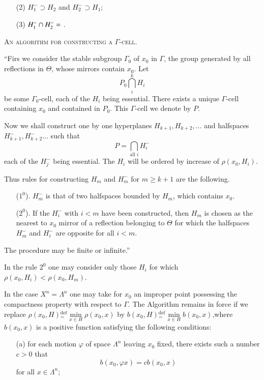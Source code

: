 \begin{enumerate}
\begin{itemize}
\item[(2)] $H^-_1 \supset H_2$ and $H^-_2 \supset H_1$;

\item[(3)] $H^-_1 \cap H^-_2 = \empty$ .
\end{itemize}

\medskip
\noindent
\textsc{An algorithm for constructing a $\Gamma$-cell.}

``Firs we consider the stable subgroup $\Gamma_0$ of $x_0$ in $\Gamma$, \ie the group generated by all reflections in $\Theta$, whose mirrors contain $x_0$. Let 
$$
P_0 \bigcap\limits^k_{i} H_i
$$
be some $\Gamma_0$-cell, each of the $H_i$ being essential. There exists a unique $\Gamma$-cell containing $x_0$ and contained in $P_0$. This $\Gamma$-cell we denote by $P$.

Now we shall construct one by one hyperplanes $H_{k+1}, H_{k+2}, \ldots$ and halfspaces $H^-_{k+1}, H^-_{k+2} \ldots$ such that 
$$
P = \bigcap\limits_{\text{all } i} H^-_i
$$
each of the $H^-_j$ being essential. The $H_i$ will be ordered by increase of $\rho (x_0, H_i)$.

Thus rules for constructing $H_m$ and $H^-_m$ for $m\geqslant k +1$ are the following.
\begin{itemize}
\item[($1^0$).] $H^-_m$ is that of two halfspaces bounded by $H_m$, which contains $x_0$.

\item[($2^0$).] If the $H^-_i$ with $i < m$ have been constructed, then $H_m$ is chosen as the nearest to $x_0$ mirror of a reflection belonging to $\Theta$ for which the halfspaces $H^-_m$ and $H^-_i$ are opposite for all $i < m$.
\end{itemize}

The procedure may be finite or infinite.''

In the rule $2^0$ one may consider only those $H_i$ for which $\rho(x_0, H_i) < \rho (x_0 , H_m)$.

In the case $X^n = \Lambda^n$ one may take for $x_0$ an improper point possessing the compactness property with respect to $\Gamma$. The Algorithm remains in force if we replace $\rho (x_0, H) {}^{\text{def}}_= \min\limits_{x \in H} \rho (x_0, x) $ by $b(x_0, H) {}^{\text{def}}_= \min\limits_{x \in H} b(x_0 ,x)$,\pageoriginale where $b(x_0, x)$ is a positive function satisfying the following conditions:
\begin{itemize}
\item[(a)] for each motion $\varphi$ of space $\Lambda^n$ leaving $x_0$ fixed, there exists such a number $c > 0$ that
$$
b (x_0 , \varphi x) = c b( x_0 , x)
$$
for all $x \in \Lambda^n$;


\end{itemize}
\end{enumerate}
